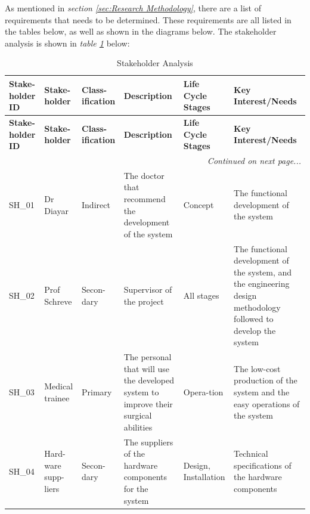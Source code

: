 As mentioned in \textit{section \ref{sec:Research Methodology}}, there are a list of requirements that needs to be determined. These requirements are all listed in the tables below, as well as shown in the diagrams below. The stakeholder analysis is shown in \textit{table \ref{tab:stakeholders}} below:

\begin{longtable}{|p{}|p{}|p{}|p{}|p{}|p{}|}

    \caption{Stakeholder Analysis}              %
    \label{tab:stakeholders}\\
\hline
\textbf{Stake-holder ID} & 
\textbf{Stake-holder} & 
\textbf{Class-ification} & 
\textbf{Description} & 
\textbf{Life Cycle Stages} & 
\textbf{Key Interest/Needs} \\
\hline
\endfirsthead

\hline
\textbf{Stake-holder ID} & 
\textbf{Stake-holder} & 
\textbf{Class-ification} & 
\textbf{Description} & 
\textbf{Life Cycle Stages} & 
\textbf{Key Interest/Needs} \\
\hline
\endhead

\hline
\multicolumn{6}{r|}{\textit{Continued on next page...}} \\
\hline
\endfoot

\endlastfoot

SH\_01 & 
Dr Diayar & 
Indirect & 
The doctor that recommend the development of the system & 
Concept & 
The functional development of the system \\
\hline

SH\_02 & 
Prof Schreve & 
Secon-dary & 
Supervisor of the project & 
All stages & 
The functional development of the system, and the engineering 
design methodology followed to develop the system \\
\hline

SH\_03 & 
Medical trainee & 
Primary & 
The personal that will use the developed system to improve 
their surgical abilities & 
Opera-tion & 
The low-cost production of the system and the easy operations 
of the system \\
\hline

SH\_04 & 
Hard-ware supp-liers & 
Secon-dary & 
The suppliers of the hardware components for the system & 
Design, Installation & 
Technical specifications of the hardware components \\
\hline


\end{longtable}

